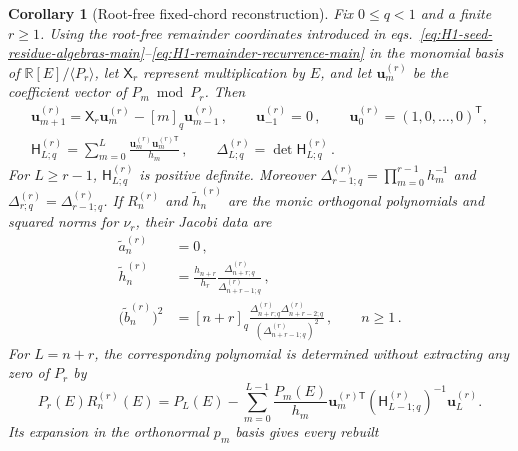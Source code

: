 \documentclass[a4paper,11pt]{article}
\newtheorem{corollary}[proposition]{Corollary}
\theoremstyle{definition}
\theoremstyle{remark}
\newcommand{\RR}{\mathbb R}
\newcommand{\thh}{\widetilde h}
\begin{document}
\begin{corollary}[Root-free fixed-chord reconstruction]
\label{cor:qhermite-root-free-app}
Fix $0\le q<1$ and a finite $r\ge1$.
Using the root-free remainder coordinates introduced in
eqs.~\eqref{eq:H1-seed-residue-algebras-main}--\eqref{eq:H1-remainder-recurrence-main}
in the monomial basis of $\RR[E]/\langle P_r\rangle$,
let $\mathsf X_r$ represent multiplication
by $E$, and let $\boldsymbol u_m^{(r)}$ be the coefficient vector of
$P_m\bmod P_r$.  Then
\begin{equation}
\begin{gathered}
   \boldsymbol u_{m+1}^{(r)}
   =\mathsf X_r\boldsymbol u_m^{(r)}
      -[m]_q\boldsymbol u_{m-1}^{(r)}\,,\qquad
   \boldsymbol u_{-1}^{(r)}=0\,,\qquad
   \boldsymbol u_0^{(r)}=(1,0,\ldots,0)^{\mathsf T},\\
   \mathsf H_{L;q}^{(r)}
   =\sum_{m=0}^{L}
      \frac{\boldsymbol u_m^{(r)}
      \boldsymbol u_m^{(r)\mathsf T}}{h_m}\,,
   \qquad
   \Delta_{L;q}^{(r)}=\det\mathsf H_{L;q}^{(r)} \,.
   \label{eq:qhermite-remainder-gram-app}
\end{gathered}
\end{equation}
For $L\ge r-1$, $\mathsf H_{L;q}^{(r)}$ is positive definite.  Moreover
$\Delta_{r-1;q}^{(r)}=\prod_{m=0}^{r-1}h_m^{-1}$ and
$\Delta_{r;q}^{(r)}=\Delta_{r-1;q}^{(r)}$.  If
$R_n^{(r)}$ and $\thh_n^{(r)}$ are the monic orthogonal polynomials
and squared norms for $\nu_r$, their Jacobi data are
\begin{equation}
\begin{aligned}
   \widetilde a_n^{(r)}&=0\,,\\
   \thh_n^{(r)}
   &=\frac{h_{n+r}}{h_r}
     \frac{\Delta_{n+r;q}^{(r)}}{\Delta_{n+r-1;q}^{(r)}}\,,\\
   \bigl(\widetilde b_n^{(r)}\bigr)^2
   &=[n+r]_q
     \frac{\Delta_{n+r;q}^{(r)}
           \Delta_{n+r-2;q}^{(r)}}
          {(\Delta_{n+r-1;q}^{(r)})^2}\,,
   \qquad n\ge1\,.
   \label{eq:qhermite-shifted-data-app}
\end{aligned}
\end{equation}
For $L=n+r$, the corresponding polynomial is determined without
extracting any zero of $P_r$ by
\begin{equation}
   P_r(E)R_n^{(r)}(E)=P_L(E)
   -\sum_{m=0}^{L-1}\frac{P_m(E)}{h_m}
    \boldsymbol u_m^{(r)\mathsf T}
    (\mathsf H_{L-1;q}^{(r)})^{-1}\boldsymbol u_L^{(r)}.
   \label{eq:qhermite-shifted-polynomial-app}
\end{equation}
Its expansion in the orthonormal $p_m$ basis gives every rebuilt

\end{corollary}
\end{document}
